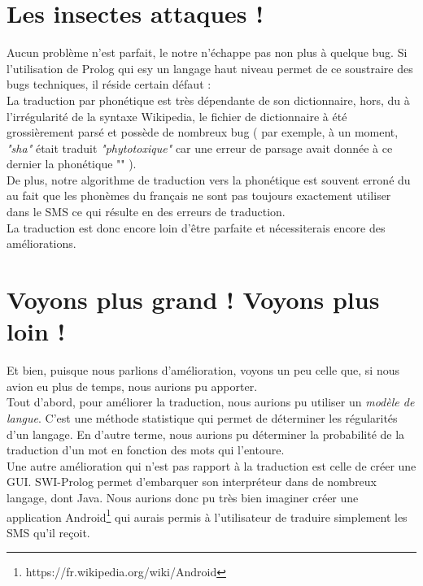 \documentclass[11pt]{report}
\begin{document}
	\section{Les insectes attaques !}
	Aucun problème n'est parfait, le notre n’échappe pas non plus à quelque bug. Si l'utilisation de Prolog qui esy un langage haut niveau permet de ce soustraire des bugs techniques, il réside certain défaut :\\
	La traduction par phonétique est très dépendante de son dictionnaire, hors, du à l'irrégularité de la syntaxe Wikipedia, le fichier de dictionnaire à été grossièrement parsé et possède de nombreux bug ( par exemple, à un moment, {\em "sha"} était traduit {\em "phytotoxique"} car une erreur de parsage avait donnée à ce dernier la phonétique "" ).\\
	De plus, notre algorithme de traduction vers la phonétique est souvent erroné du au fait que les phonèmes du français ne sont pas toujours exactement utiliser dans le SMS ce qui résulte en des erreurs de traduction.\\
	La traduction est donc encore loin d'être parfaite et nécessiterais encore des améliorations. 
	
	\section{Voyons plus grand ! Voyons plus loin !}
	Et bien, puisque nous parlions d'amélioration, voyons un peu celle que, si nous avion eu plus de temps, nous aurions pu apporter.\\
	Tout d'abord, pour améliorer la traduction, nous aurions pu utiliser un {\em modèle de langue}. C'est une méthode statistique qui permet de déterminer les régularités d'un langage. En d'autre terme, nous aurions pu déterminer la probabilité de la traduction d'un mot en fonction des mots qui l'entoure.\\
	Une autre amélioration qui n'est pas rapport à la traduction est celle de créer une GUI. SWI-Prolog permet d'embarquer son interpréteur dans de nombreux langage, dont Java. Nous aurions donc pu très bien imaginer créer une application Android\footnote{https://fr.wikipedia.org/wiki/Android} qui aurais permis à l'utilisateur de traduire simplement les SMS qu'il reçoit.
	
\end{document}
